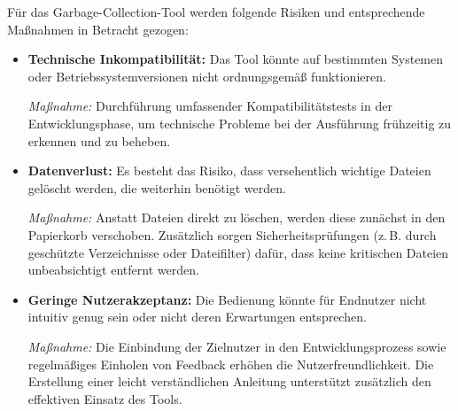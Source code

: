 Für das Garbage-Collection-Tool werden folgende Risiken und entsprechende Maßnahmen in Betracht gezogen:

\begin{itemize}
  \item \textbf{Technische Inkompatibilität:} Das Tool könnte auf bestimmten Systemen oder Betriebssystemversionen nicht ordnungsgemäß funktionieren.

  \textit{Maßnahme:} Durchführung umfassender Kompatibilitätstests in der Entwicklungsphase, um technische Probleme bei der Ausführung frühzeitig zu erkennen und zu beheben.

  \item \textbf{Datenverlust:} Es besteht das Risiko, dass versehentlich wichtige Dateien gelöscht werden, die weiterhin benötigt werden.

  \textit{Maßnahme:} Anstatt Dateien direkt zu löschen, werden diese zunächst in den Papierkorb verschoben. Zusätzlich sorgen Sicherheitsprüfungen (z.\,B. durch geschützte Verzeichnisse oder Dateifilter) dafür, dass keine kritischen Dateien unbeabsichtigt entfernt werden.

  \item \textbf{Geringe Nutzerakzeptanz:} Die Bedienung könnte für Endnutzer nicht intuitiv genug sein oder nicht deren Erwartungen entsprechen.

  \textit{Maßnahme:} Die Einbindung der Zielnutzer in den Entwicklungsprozess sowie regelmäßiges Einholen von Feedback erhöhen die Nutzerfreundlichkeit. Die Erstellung einer leicht verständlichen Anleitung unterstützt zusätzlich den effektiven Einsatz des Tools.
\end{itemize}
    